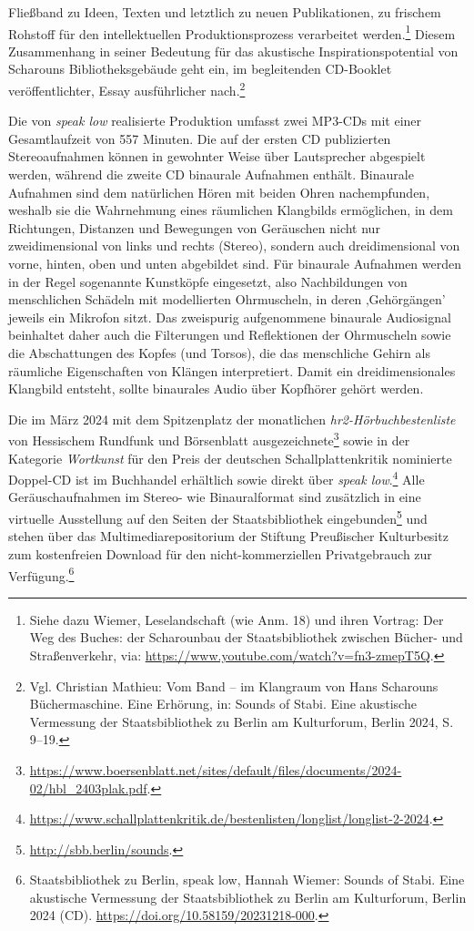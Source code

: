\documentclass[a4paper,
fontsize=11pt,
oneside,
numbers=noperiodatend,
parskip=half-,
bibliography=totoc,
final
]{scrartcl}
\begin{document}
Fließband zu Ideen, Texten und letztlich zu neuen Publikationen, zu
frischem Rohstoff für den intellektuellen Produktionsprozess verarbeitet
werden.\footnote{Siehe dazu Wiemer, Leselandschaft (wie Anm. 18) und
  ihren Vortrag: Der Weg des Buches: der Scharounbau der
  Staatsbibliothek zwischen Bücher- und Straßenverkehr, via:
  \url{https://www.youtube.com/watch?v=fn3-zmepT5Q}.} Diesem
Zusammenhang in seiner Bedeutung für das akustische
Inspirationspotential von Scharouns Bibliotheksgebäude geht ein, im
begleitenden CD-Booklet veröffentlichter, Essay ausführlicher
nach.\footnote{Vgl. Christian Mathieu: Vom Band -- im Klangraum von Hans
  Scharouns Büchermaschine. Eine Erhörung, in: Sounds of Stabi. Eine
  akustische Vermessung der Staatsbibliothek zu Berlin am Kulturforum,
  Berlin 2024, S. 9--19.}

Die von \emph{speak low} realisierte Produktion umfasst zwei MP3-CDs mit
einer Gesamtlaufzeit von 557 Minuten. Die auf der ersten CD publizierten
Stereoaufnahmen können in gewohnter Weise über Lautsprecher abgespielt
werden, während die zweite CD binaurale Aufnahmen enthält. Binaurale
Aufnahmen sind dem natürlichen Hören mit beiden Ohren nachempfunden,
weshalb sie die Wahrnehmung eines räumlichen Klangbilds ermöglichen, in
dem Richtungen, Distanzen und Bewegungen von Geräuschen nicht nur
zweidimensional von links und rechts (Stereo), sondern auch
dreidimensional von vorne, hinten, oben und unten abgebildet sind. Für
binaurale Aufnahmen werden in der Regel sogenannte Kunstköpfe
eingesetzt, also Nachbildungen von menschlichen Schädeln mit
modellierten Ohrmuscheln, in deren ‚Gehörgängen' jeweils ein Mikrofon
sitzt. Das zweispurig aufgenommene binaurale Audiosignal beinhaltet
daher auch die Filterungen und Reflektionen der Ohrmuscheln sowie die
Abschattungen des Kopfes (und Torsos), die das menschliche Gehirn als
räumliche Eigenschaften von Klängen interpretiert. Damit ein
dreidimensionales Klangbild entsteht, sollte binaurales Audio über
Kopfhörer gehört werden.

Die im März 2024 mit dem Spitzenplatz der monatlichen
\emph{hr2-Hörbuchbestenliste} von Hessischem Rundfunk und Börsenblatt
ausgezeichnete\footnote{\url{https://www.boersenblatt.net/sites/default/files/documents/2024-02/hbl_2403plak.pdf}.}
sowie in der Kategorie \emph{Wortkunst} für den Preis der deutschen
Schallplattenkritik nominierte Doppel-CD ist im Buchhandel erhältlich
sowie direkt über \emph{speak low}.\footnote{\url{https://www.schallplattenkritik.de/bestenlisten/longlist/longlist-2-2024}.}
Alle Geräuschaufnahmen im Stereo- wie Binauralformat sind zusätzlich in
eine virtuelle Ausstellung auf den Seiten der Staatsbibliothek
eingebunden\footnote{\url{http://sbb.berlin/sounds}.} und stehen über
das Multimediarepositorium der Stiftung Preußischer Kulturbesitz zum
kostenfreien Download für den nicht-kommerziellen Privatgebrauch zur
Verfügung.\footnote{Staatsbibliothek zu Berlin, speak low, Hannah Wiemer: Sounds of Stabi. Eine akustische Vermessung der Staatsbibliothek zu Berlin am Kulturforum, Berlin 2024 (CD). \url{https://doi.org/10.58159/20231218-000}.}
\end{document}
